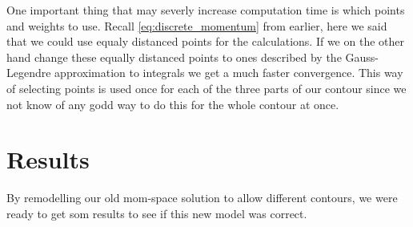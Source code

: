 One important thing that may severly increase computation time is which points and weights to use.
Recall \cref{eq:discrete_momentum} from earlier, here we said that we could use equaly distanced points for the calculations.
If we on the other hand change these equally distanced points to ones described by the Gauss-Legendre approximation to integrals we get a much faster convergence.
This way of selecting points is used once for each of the three parts of our contour since we not know of any godd way to do this for the whole contour at once.

\section{Results}
By remodelling our old mom-space solution to allow different contours, we were ready to get som results to see if this new model was correct.
